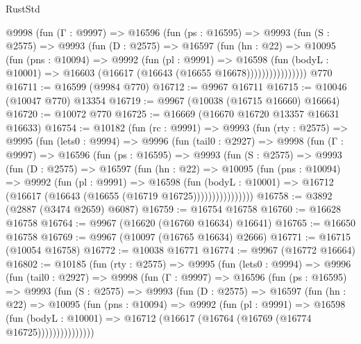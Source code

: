 \begin{lexlean}{RustStd}
\begin{coremodule}
{\begin{coremodule}
{{{{{{{{{{{{{{{{{{{{{{{{{{{{{{{{{{{{{{{{{{{{{{{{{{{{{{{{{{{{{{{{{{{{{{{{{{{{{{            @9998
              (fun (Γ : @9997) =>
              @16596
                (fun (ps : @16595) =>
                @9993
                  (fun (S : @2575) =>
                  @9993
                    (fun (D : @2575) =>
                    @16597
                      (fun (hn : @22) =>
                      @10095
                        (fun (pns : @10094) =>
                        @9992
                          (fun (pl : @9991) =>
                          @16598
                            (fun (bodyL : @10001) =>
                            @16603 (@16617 (@16643 (@16655 @16678))))))))))))))))
    @770
@16711 := @16599 (@9984 @770)
@16712 := @9967 @16711
@16715 := @10046 (@10047 @770) @13354
@16719 := @9967 (@10038 (@16715 @16660) @16664)
@16720 := @10072 @770
@16725 := @16669 (@16670 @16720 @13357 @16631 @16633)
@16754 := @10182
    (fun (rc : @9991) =>
    @9993
      (fun (rty : @2575) =>
      @9995
        (fun (lets0 : @9994) =>
        @9996
          (fun (tail0 : @2927) =>
          @9998
            (fun (Γ : @9997) =>
            @16596
              (fun (ps : @16595) =>
              @9993
                (fun (S : @2575) =>
                @9993
                  (fun (D : @2575) =>
                  @16597
                    (fun (hn : @22) =>
                    @10095
                      (fun (pns : @10094) =>
                      @9992
                        (fun (pl : @9991) =>
                        @16598
                          (fun (bodyL : @10001) =>
                          @16712 (@16617 (@16643 (@16655 (@16719 @16725))))))))))))))))
@16758 := @3892 (@2887 (@3474 @2659) @6087)
@16759 := @16754 @16758
@16760 := @16628 @16758
@16764 := @9967 (@16620 (@16760 @16634) @16641)
@16765 := @16650 @16758
@16769 := @9967 (@10097 (@16765 @16634) @2666)
@16771 := @16715 (@10054 @16758)
@16772 := @10038 @16771
@16774 := @9967 (@16772 @16664)
@16802 := @10185
    (fun (rty : @2575) =>
    @9995
      (fun (lets0 : @9994) =>
      @9996
        (fun (tail0 : @2927) =>
        @9998
          (fun (Γ : @9997) =>
          @16596
            (fun (ps : @16595) =>
            @9993
              (fun (S : @2575) =>
              @9993
                (fun (D : @2575) =>
                @16597
                  (fun (hn : @22) =>
                  @10095
                    (fun (pns : @10094) =>
                    @9992
                      (fun (pl : @9991) =>
                      @16598
                        (fun (bodyL : @10001) =>
                        @16712 (@16617 (@16764 (@16769 (@16774 @16725)))))))))))))))
}}}}}}}}}}}}}}}}}}}}}}}}}}}}}}}}}}}}}}}}}}}}}}}}}}}}}}}}}}}}}}}}}}}}}}}}}}}}}}
\end{coremodule}}
\end{coremodule}
\end{lexlean}
